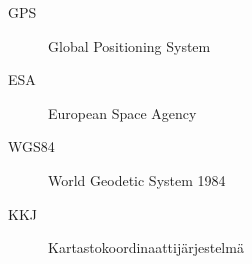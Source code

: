 \documentclass[dissertation,math,vertlayout,pdfa,colorlinks,nologo]{aaltoseries}
\begin{document}
\begin{abstract}[finnish]
Zirkoniumoksidin perustavanlaatuisia ominaisuuksia tarkasteltiin perustuen 
mikroskooppisten hilavirheiden muuttumiseen tutkittavissa Zircaloy-4 -näyt\-teissä, joita
oli hapetettu painevesireaktoria vastaavissa olosuhteissa. Doppler-levenemä\-spektroskopiaa
ja teoreettista mallinnusta sovellettiin hapettumiskerrosten hilavirheiden tutkimiseen. 
Positronien elinaikaspektrokopiaa käytettiin toivutettujen ja protonisäteilytykselle 
altistettujen volframinäytteiden monovakanssien tutkimiseen. Välisija-atomien
ja monovakanssien migraatioenergiarajat pystyttiin havaitsemaan suoraan 
elinaikaspektrometrilla, joka oli yhdistetty kylmäsäteilytyslaitteistoon.

\end{abstract}


\begin{abstract}[swedish]\lipsum[7-9]\end{abstract}


\begin{preface}
\lipsum[1-4]
\end{preface}

\clearpage
\tableofcontents


\listofpublications

\listoffigures
\listoftables


\abbreviations

\begin{description}
\item[GPS] Global Positioning System
\item[ESA] European Space Agency
\item[WGS84] World Geodetic System 1984
\item[KKJ] Kartastokoordinaattijärjestelmä
\end{description}
\end{document}
